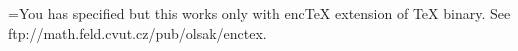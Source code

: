 
\ifx\xordcode\undefined
   \errhelp={You has specified \let\enc=w but this works only with encTeX
   extension of TeX binary. See ftp://math.feld.cvut.cz/pub/olsak/enctex.}
   \endinput \fi

\def\setinputchr #1 #2 {\xordcode#1=#2 \xchrcode#2=#1 }

\setinputchr  "BC   "A5  %
\setinputchr  "BE   "B5  %
\setinputchr  "8A   "A9  %
\setinputchr  "9A   "B9  %
\setinputchr  "8D   "AB  %
\setinputchr  "9D   "BB  %
\setinputchr  "8E   "AE  %
\setinputchr  "9E   "BE  %

\global\everyjob=\expandafter{\the\everyjob
   \message{The CP1250->ISO-8859-2 re-encoding is activated by encTeX}}

\endinput

